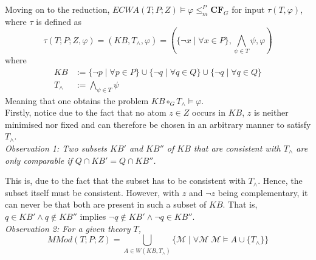 \documentclass[11pt,a4paper]{article}
\newcommand{\nmodels}{\not\models}
\begin{document}
\begin{enumerate}
\begin{itemize}
Moving on to the reduction, $\mathit{ECWA}(T;P;Z) \models \varphi  \leq_m^P \textbf{CF}_G $ for input $\tau(T,\varphi)$, where $\tau$ is defined as
\begin{equation*}
\tau(T;P;Z, \varphi)  =  ( \mathit{KB}, T_{\land}, \varphi) = (\{ \neg x \mid \forall x \in P\}, \bigwedge_{\psi \in T} \psi, \varphi)
\end{equation*}
where 
\begin{equation*}
\begin{split}
\mathit{KB}  &:=  \{ \neg p \mid \forall p \in P\} \cup \{ \neg q \mid \forall q \in Q\} \cup \{ \neg q \mid \forall q \in Q\} \\
 T_{\land} &:=   \bigwedge_{\psi \in T} \psi 
\end{split}
\end{equation*}
Meaning that one obtains the problem $ \mathit{KB} \circ_G T_{\land} \models \varphi$. \\


Firstly, notice due to the fact that no atom $z \in Z$ occurs in $\mathit{KB}$, $z$ is neither minimised nor fixed and can therefore be chosen in an arbitrary manner to satisfy $T_{\land}$. \\


\emph{Observation 1:  Two subsets $\mathit{KB}'$ and $\mathit{KB}''$ of $\mathit{KB}$ that are consistent with $T_{\land}$ are only comparable if $Q \cap \mathit{KB}' =Q \cap \mathit{KB}''$. 
}

This is, due to the fact that the subset has to be consistent with $T_{\land}$. Hence, the subset itself must be consistent. However, with $z$ and $\neg z$ being complementary, it can never be that both are present in such a subset of $\mathit{KB}$. That is, $q \in \mathit{KB}' \land q \notin \mathit{KB}'' $  implies  $\neg q \notin \mathit{KB}' \land \neg q \in \mathit{KB}'' $. \\


\emph{Observation 2: For a given theory $T$, 
\begin{equation*}
\mathit{MMod}(T;P;Z) = \bigcup_{A \in W( \mathit{KB} , T_{\land})} \{ \mathcal{M} \mid \forall \mathcal{M} \; \mathcal{M} \models A \cup \{T_{\land} \}\}
\end{equation*}}



\end{itemize}
\end{enumerate}
\end{document}
